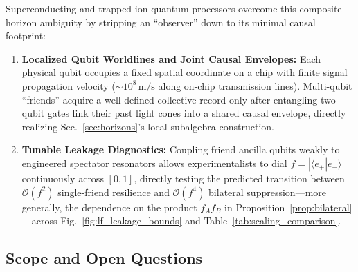 Superconducting and trapped-ion quantum processors overcome this composite-horizon ambiguity by stripping an ``observer'' down to its minimal causal footprint:
\begin{enumerate}
    \item \textbf{Localized Qubit Worldlines and Joint Causal Envelopes:} Each physical qubit occupies a fixed spatial coordinate on a chip with finite signal propagation velocity ($\sim 10^8\,\mathrm{m/s}$ along on-chip transmission lines). Multi-qubit ``friends'' acquire a well-defined collective record only after entangling two-qubit gates link their past light cones into a shared causal envelope, directly realizing Sec.~\ref{sec:horizons}'s local subalgebra construction.
    \item \textbf{Tunable Leakage Diagnostics:} Coupling friend ancilla qubits weakly to engineered spectator resonators allows experimentalists to dial $f = |\langle e_+ | e_- \rangle|$ continuously across $[0, 1]$, directly testing the predicted transition between $\mathcal{O}(f^2)$ single-friend resilience and $\mathcal{O}(f^4)$ bilateral suppression---more generally, the dependence on the product $f_A f_B$ in Proposition~\ref{prop:bilateral}---across Fig.~\ref{fig:lf_leakage_bounds} and Table~\ref{tab:scaling_comparison}.
\end{enumerate}

\subsection{Scope and Open Questions}

